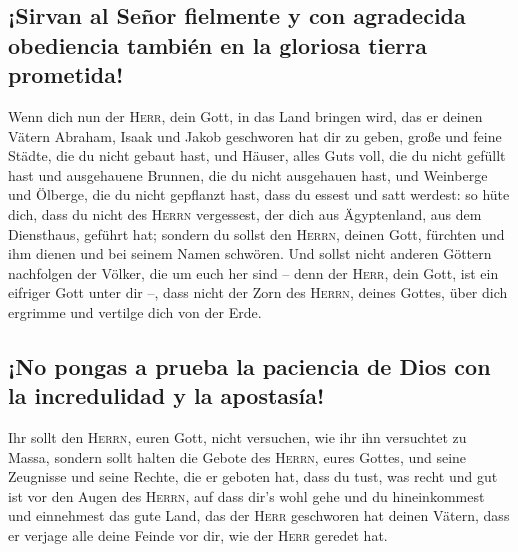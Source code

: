 \hypertarget{sirvan-al-seuxf1or-fielmente-y-con-agradecida-obediencia-tambiuxe9n-en-la-gloriosa-tierra-prometida}{%
\subsection{¡Sirvan al Señor fielmente y con agradecida obediencia
también en la gloriosa tierra
prometida!}\label{sirvan-al-seuxf1or-fielmente-y-con-agradecida-obediencia-tambiuxe9n-en-la-gloriosa-tierra-prometida}}

 Wenn dich nun der \textsc{Herr}, dein Gott, in das Land
bringen wird, das er deinen Vätern Abraham, Isaak und Jakob geschworen
hat dir zu geben, große und feine Städte, die du nicht gebaut hast,
 und Häuser, alles Guts voll, die du nicht gefüllt hast
und ausgehauene Brunnen, die du nicht ausgehauen hast, und Weinberge und
Ölberge, die du nicht gepflanzt hast, dass du essest und satt werdest:
 so hüte dich, dass du nicht des \textsc{Herrn}
vergessest, der dich aus Ägyptenland, aus dem Diensthaus, geführt hat;
 sondern du sollst den \textsc{Herrn}, deinen Gott,
fürchten und ihm dienen und bei seinem Namen schwören. 
Und sollst nicht anderen Göttern nachfolgen der Völker, die um euch her
sind --  denn der \textsc{Herr}, dein Gott, ist ein
eifriger Gott unter dir --, dass nicht der Zorn des \textsc{Herrn},
deines Gottes, über dich ergrimme und vertilge dich von der Erde.

\hypertarget{no-pongas-a-prueba-la-paciencia-de-dios-con-la-incredulidad-y-la-apostasuxeda}{%
\subsection{¡No pongas a prueba la paciencia de Dios con la incredulidad
y la
apostasía!}\label{no-pongas-a-prueba-la-paciencia-de-dios-con-la-incredulidad-y-la-apostasuxeda}}

 Ihr sollt den \textsc{Herrn}, euren Gott, nicht
versuchen, wie ihr ihn versuchtet zu Massa,  sondern
sollt halten die Gebote des \textsc{Herrn}, eures Gottes, und seine
Zeugnisse und seine Rechte, die er geboten hat,  dass du
tust, was recht und gut ist vor den Augen des \textsc{Herrn}, auf dass
dir's wohl gehe und du hineinkommest und einnehmest das gute Land, das
der \textsc{Herr} geschworen hat deinen Vätern,  dass er
verjage alle deine Feinde vor dir, wie der \textsc{Herr} geredet hat.

